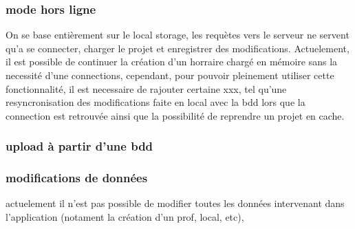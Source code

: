 \subsubsection{mode hors ligne}
On se base entièrement sur le local storage, les requètes vers le serveur ne
servent qu'a se connecter, charger le projet et enregistrer des modifications.
Actuelement, il est possible de continuer la création d'un horraire chargé en
mémoire sans la necessité d'une connections, cependant, pour pouvoir pleinement
utiliser cette fonctionnalité, il est necessaire de rajouter certaine xxx, tel
qu'une resyncronisation des modifications faite en local avec la bdd lors que la
connection est retrouvée ainsi que la possibilité de reprendre un projet en
cache.
\subsubsection{upload à partir d'une bdd}
\subsubsection{modifications de données}
actuelement il n'est pas possible de modifier toutes les données intervenant
dans l'application (notament la création d'un prof, local, etc), 
